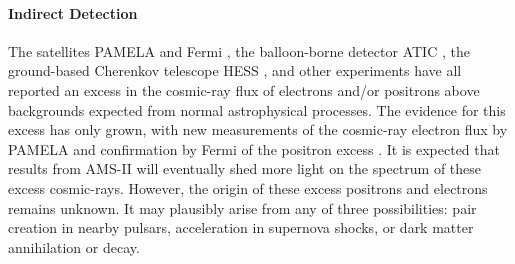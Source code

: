 
\paragraph{Indirect Detection}The satellites PAMELA \cite{Adriani:2008zr} and Fermi \cite{Ackermann:2010ij}, the balloon-borne detector ATIC \cite{Chang:2008aa}, the ground-based Cherenkov telescope HESS \cite{Aharonian:2008aa,Aharonian:2009ah}, and other experiments have all reported an excess in the cosmic-ray flux of electrons and/or positrons above backgrounds expected from normal astrophysical processes.  The evidence for this excess has only grown, with new measurements of the cosmic-ray electron flux by PAMELA \cite{Adriani:2011xv} and confirmation by Fermi of the positron excess \cite{FermiLAT:2011ab}.  It is expected that results from AMS-II will eventually shed more light on the spectrum of these excess cosmic-rays.  However, the origin of these excess positrons and electrons remains unknown.  It may plausibly arise from any of three possibilities: pair creation in nearby pulsars, acceleration in supernova shocks, or dark matter annihilation or decay.

